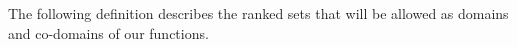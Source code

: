  
%
%









The following definition describes the  ranked sets that will be allowed as domains and co-domains of our functions.  


